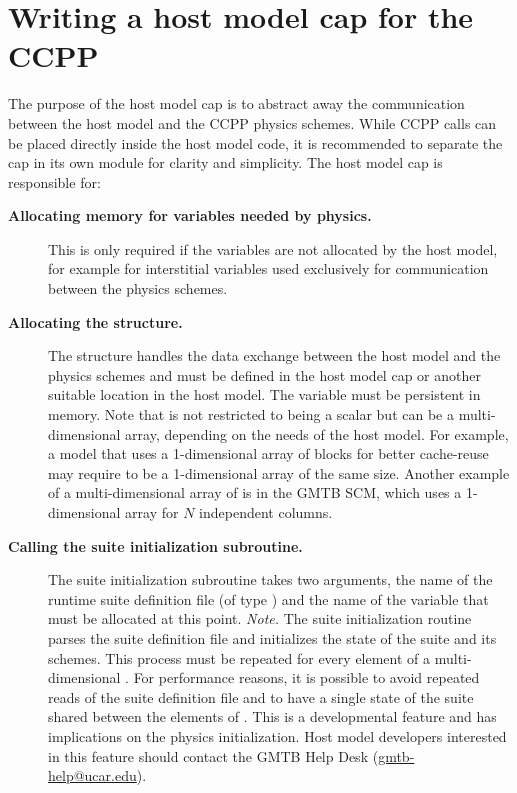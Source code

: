 \section{Writing a host model cap for the CCPP}
\label{sec_hostmodel_cap}
The purpose of the host model cap is to abstract away the communication between the host model and the CCPP physics schemes. While CCPP calls can be placed directly inside the host model code, it is recommended to separate the cap in its own module for clarity and simplicity. The host model cap is responsible for:
\begin{description}
\item[\textbf{Allocating memory for variables needed by physics.}] This is only required if the variables are not allocated by the host model, for example for interstitial variables used exclusively for communication between the physics schemes.
\item[\textbf{Allocating the  structure.}] The  structure handles the data exchange between the host model and the physics schemes and must be defined in the host model cap or another suitable location in the host model. The  variable must be persistent in memory. Note that  is not restricted to being a scalar but can be a multi-dimensional array, depending on the needs of the host model. For example, a model that uses a 1-dimensional array of blocks for better cache-reuse may require  to be a 1-dimensional array of the same size. Another example of a multi-dimensional array of  is in the GMTB SCM, which uses a 1-dimensional  array for $N$ independent columns.
\item[\textbf{Calling the suite initialization subroutine.}] The suite initialization subroutine takes two arguments, the name of the runtime suite definition file (of type ) and the name of the  variable that must be allocated at this point. \emph{Note.} The suite initialization routine  parses the suite definition file and initializes the state of the suite and its schemes. This process must be repeated for every element of a multi-dimensional . For performance reasons, it is possible to avoid repeated reads of the suite definition file and to have a single state of the suite shared between the elements of . This is a developmental feature and has implications on the physics initialization. Host model developers interested in this feature should contact the GMTB Help Desk (\url{gmtb-help@ucar.edu}).

\end{description}
